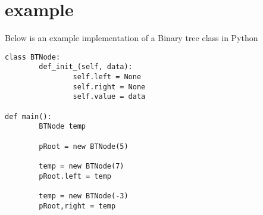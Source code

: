 \documentclass[12pt]{book}
\begin{document}
\section*{example}
Below is an example implementation of a Binary tree class in Python
\begin{verbatim}
class BTNode:
        def_init_(self, data):
                self.left = None
                self.right = None
                self.value = data

def main():
        BTNode temp

        pRoot = new BTNode(5)

        temp = new BTNode(7)
        pRoot.left = temp

        temp = new BTNode(-3)
        pRoot,right = temp
\end{verbatim}
\end{document}
